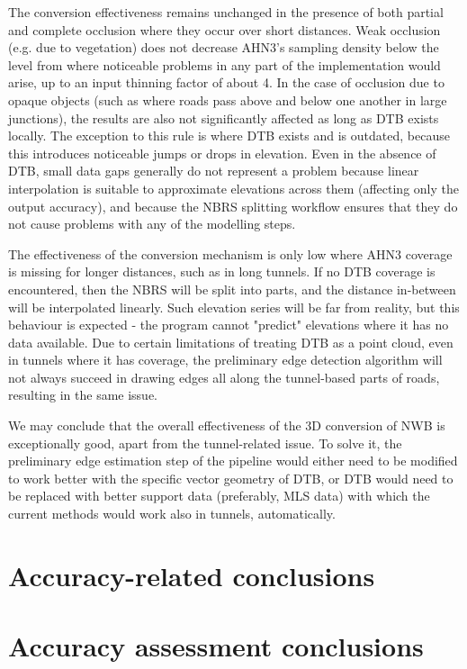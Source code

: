 The conversion effectiveness remains unchanged in the presence of both partial and complete occlusion where they occur over short distances. Weak occlusion (e.g. due to vegetation) does not decrease AHN3's sampling density below the level from where noticeable problems in any part of the implementation would arise, up to an input thinning factor of about 4. In the case of occlusion due to opaque objects (such as where roads pass above and below one another in large junctions), the results are also not significantly affected as long as DTB exists locally. The exception to this rule is where DTB exists and is outdated, because this introduces noticeable jumps or drops in elevation. Even in the absence of DTB, small data gaps generally do not represent a problem because linear interpolation is suitable to approximate elevations across them (affecting only the output accuracy), and because the NBRS splitting workflow ensures that they do not cause problems with any of the modelling steps.

The effectiveness of the conversion mechanism is only low where AHN3 coverage is missing for longer distances, such as in long tunnels. If no DTB coverage is encountered, then the NBRS will be split into parts, and the distance in-between will be interpolated linearly. Such elevation series will be far from reality, but this behaviour is expected - the program cannot "predict" elevations where it has no data available. Due to certain limitations of treating DTB as a point cloud, even in tunnels where it has coverage, the preliminary edge detection algorithm will not always succeed in drawing edges all along the tunnel-based parts of roads, resulting in the same issue.

We may conclude that the overall effectiveness of the 3D conversion of NWB is exceptionally good, apart from the tunnel-related issue. To solve it, the preliminary edge estimation step of the pipeline would either need to be modified to work better with the specific vector geometry of DTB, or DTB would need to be replaced with better support data (preferably, MLS data) with which the current methods would work also in tunnels, automatically.

\section{Accuracy-related conclusions}
\label{sec:conclusionsaccuracy}

\section{Accuracy assessment conclusions}
\label{sec:conclusionsaccuracyassessment}

